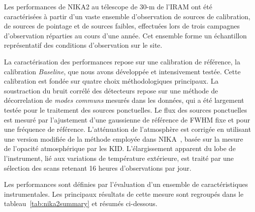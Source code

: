 Les performances de NIKA2 au télescope de 30-m de l'IRAM ont été
caractérisées à partir d'un vaste ensemble d'observation de sources de
calibration, de sources de pointage et de sources faibles, effectuées
lors de trois campagnes d'observation réparties au cours d'une année. Cet
ensemble forme un échantillon représentatif des conditions
d'observation sur le site.

La caractérisation des performances repose sur une calibration de
référence, la calibration \emph{Baseline}, que nous avons développée
et intensivement testée. Cette calibration est fondée sur quatre
choix méthodologiques principaux. La soustraction du bruit corrélé des
détecteurs repose sur une méthode de décorrelation de \emph{modes
  communs} mesurés dans les données, qui a été largement testée pour
le traitement des sources ponctuelles. Le flux des sources ponctuelles
est mesuré par l'ajustement d'une gaussienne de référence de FWHM fixe
et pour une fréquence de référence. L'atténuation de l'atmosphère est
corrigée en utilisant une version modifiée de la méthode employée dans
NIKA~\citep{Catalano2014}, basée sur la mesure de l'opacité
atmosphérique par les KID. L'élargissement apparent du
lobe de l'instrument, lié aux variations de température extérieure,
est traité par une sélection des scans retenant 16 heures
d'observations par jour.

Les performances sont définies par l'évaluation d'un ensemble de
caractéristiques instrumentales. Les principaux résultats de cette
mesure sont regroupés dans le tableau~\ref{tab:nika2summary} et
résumés ci-dessous.

